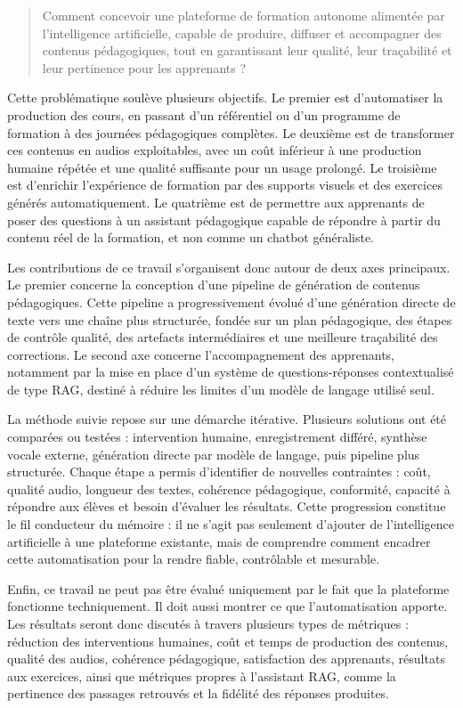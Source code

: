 \begin{quote}
Comment concevoir une plateforme de formation autonome alimentée par
l'intelligence artificielle, capable de produire, diffuser et accompagner des contenus
pédagogiques, tout en garantissant leur qualité, leur traçabilité et leur pertinence pour
les apprenants ?
\end{quote}

Cette problématique soulève plusieurs objectifs. Le premier est d'automatiser la
production des cours, en passant d'un référentiel ou d'un programme de formation à des
journées pédagogiques complètes. Le deuxième est de transformer ces contenus en
audios exploitables, avec un coût inférieur à une production humaine répétée et une
qualité suffisante pour un usage prolongé. Le troisième est d'enrichir l'expérience de
formation par des supports visuels et des exercices générés automatiquement. Le
quatrième est de permettre aux apprenants de poser des questions à un assistant
pédagogique capable de répondre à partir du contenu réel de la formation, et non comme
un chatbot généraliste.

Les contributions de ce travail s'organisent donc autour de deux axes principaux. Le
premier concerne la conception d'une pipeline de génération de contenus pédagogiques.
Cette pipeline a progressivement évolué d'une génération directe de texte vers une
chaîne plus structurée, fondée sur un plan pédagogique, des étapes de contrôle qualité,
des artefacts intermédiaires et une meilleure traçabilité des corrections. Le second axe
concerne l'accompagnement des apprenants, notamment par la mise en place d'un
système de questions-réponses contextualisé de type RAG, destiné à réduire les limites
d'un modèle de langage utilisé seul.

La méthode suivie repose sur une démarche itérative. Plusieurs solutions ont été
comparées ou testées : intervention humaine, enregistrement différé, synthèse vocale
externe, génération directe par modèle de langage, puis pipeline plus structurée. Chaque
étape a permis d'identifier de nouvelles contraintes : coût, qualité audio, longueur des
textes, cohérence pédagogique, conformité, capacité à répondre aux élèves et besoin
d'évaluer les résultats. Cette progression constitue le fil conducteur du mémoire : il ne
s'agit pas seulement d'ajouter de l'intelligence artificielle à une plateforme existante,
mais de comprendre comment encadrer cette automatisation pour la rendre fiable,
contrôlable et mesurable.

Enfin, ce travail ne peut pas être évalué uniquement par le fait que la plateforme
fonctionne techniquement. Il doit aussi montrer ce que l'automatisation apporte. Les
résultats seront donc discutés à travers plusieurs types de métriques : réduction des
interventions humaines, coût et temps de production des contenus, qualité des audios,
cohérence pédagogique, satisfaction des apprenants, résultats aux exercices, ainsi que
métriques propres à l'assistant RAG, comme la pertinence des passages retrouvés et la
fidélité des réponses produites.

